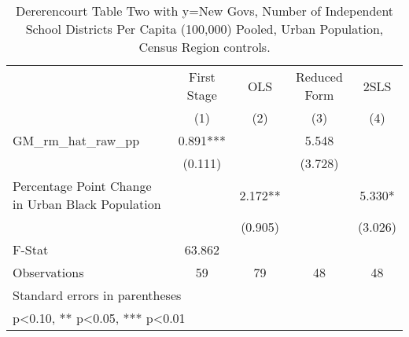 \begin{table}[htbp]\centering
\def\sym#1{\ifmmode^{#1}\else\(^{#1}\)\fi}
\caption{Dererencourt Table Two with y=New Govs, Number of Independent School Districts Per Capita (100,000) Pooled, Urban Population, Census Region controls.}
\begin{tabular}{l*{4}{c}}
\toprule
                    & First Stage   &         OLS   &Reduced Form   &        2SLS   \\
                    &\multicolumn{1}{c}{(1)}   &\multicolumn{1}{c}{(2)}   &\multicolumn{1}{c}{(3)}   &\multicolumn{1}{c}{(4)}   \\
\midrule
GM\_rm\_hat\_raw\_pp    &       0.891***&               &       5.548   &               \\
                    &     (0.111)   &               &     (3.728)   &               \\
\addlinespace
Percentage Point Change in Urban Black Population&               &       2.172** &               &       5.330*  \\
                    &               &     (0.905)   &               &     (3.026)   \\
\midrule
F-Stat              &      63.862   &               &               &               \\
Observations        &          59   &          79   &          48   &          48   \\
\bottomrule
\multicolumn{5}{l}{\footnotesize Standard errors in parentheses}\\
\multicolumn{5}{l}{\footnotesize * p<0.10, ** p<0.05, *** p<0.01}\\
\end{tabular}
\end{table}

